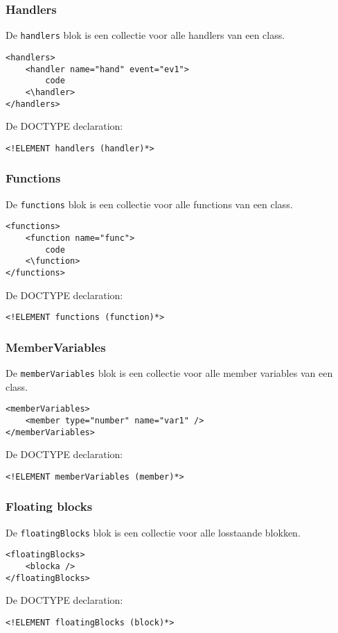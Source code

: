 \documentclass[]{article}
\begin{document}
\subsubsection{Handlers}
De \texttt{handlers} blok is een collectie voor alle handlers van een class.
\lstset{language=XML}
\begin{lstlisting}
<handlers>
	<handler name="hand" event="ev1">
		code
	<\handler>
</handlers>
\end{lstlisting}
De DOCTYPE declaration: 
\lstset{language=XML}
\begin{lstlisting}
<!ELEMENT handlers (handler)*>
\end{lstlisting}

\subsubsection{Functions}
De \texttt{functions} blok is een collectie voor alle functions van een class.
\lstset{language=XML}
\begin{lstlisting}
<functions>
	<function name="func">
		code
	<\function>
</functions>
\end{lstlisting}
De DOCTYPE declaration: 
\lstset{language=XML}
\begin{lstlisting}
<!ELEMENT functions (function)*>
\end{lstlisting}

\subsubsection{MemberVariables}
De \texttt{memberVariables} blok is een collectie voor alle member variables van een class.
\lstset{language=XML}
\begin{lstlisting}
<memberVariables>
	<member type="number" name="var1" />
</memberVariables>
\end{lstlisting}
De DOCTYPE declaration: 
\lstset{language=XML}
\begin{lstlisting}
<!ELEMENT memberVariables (member)*>
\end{lstlisting}

\subsubsection{Floating blocks}
De \texttt{floatingBlocks} blok is een collectie voor alle losstaande blokken.
\lstset{language=XML}
\begin{lstlisting}
<floatingBlocks>
	<blocka />
</floatingBlocks>
\end{lstlisting}
De DOCTYPE declaration: 
\lstset{language=XML}
\begin{lstlisting}
<!ELEMENT floatingBlocks (block)*>
\end{lstlisting}
\end{document}
